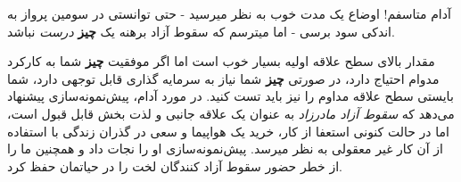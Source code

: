 آدام متاسفم! اوضاع یک مدت خوب به نظر میرسید - حتی توانستی در سومین پرواز
به اندکی سود برسی - اما میترسم که سقوط آزاد برهنه یک \textbf{چیز}
\emph{درست} نباشد.

مقدار بالای سطح علاقه اولیه بسیار خوب است اما اگر موفقیت \textbf{چیز}
شما به کارکرد مدوام احتیاج دارد، در صورتی \textbf{چیز} شما نیاز به
سرمایه گذاری قابل توجهی دارد، شما بایستی سطح علاقه مداوم را نیز باید تست
کنید. در مورد آدام، پیش‌نمونه‌سازی پیشنهاد می‌دهد که \emph{سقوط آزاد
مادرزاد} به عنوان یک علاقه جانبی و لذت بخش قابل قبول است، اما در حالت
کنونی استعفا از کار، خرید یک هواپیما و سعی در گذران زندگی با استفاده از
آن کار غیر معقولی به نظر میرسد. پیش‌نمونه‌سازی او را نجات داد و همچنین
ما را از خطر حضور سقوط آزاد کنندگان لخت را در حیاتمان حفظ کرد.

